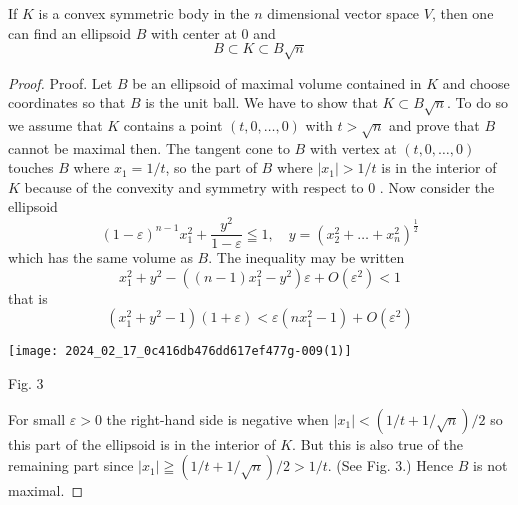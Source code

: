 \begin{lemma}
    If $K$ is a convex symmetric body in the $n$ dimensional vector space $V$, then one can find an ellipsoid $B$ with center at $0$ and
\[
	B \subset K \subset B \sqrt{n}
\]
\end{lemma}
\begin{proof}
    Proof. Let $B$ be an ellipsoid of maximal volume contained in $K$ and choose coordinates so that $B$ is the unit ball. We have to show that $K\subset B \sqrt{n}$. To do so we assume that $K$ contains a point $(t, 0, \ldots, 0)$ with $t>\sqrt{n}$ and prove that $B$ cannot be maximal then. The tangent cone to $B$ with vertex at $(t, 0, \ldots, 0)$ touches $B$ where $x_{1}=1 / t$, so the part of $B$ where $\left|x_{1}\right|>1 / t$ is in the interior of $K$ because of the convexity and symmetry with respect to 0 . Now consider the ellipsoid
\[
	(1-\varepsilon)^{n-1} x_{1}^{2}+ \frac{y^{2}}{1-\varepsilon}\leqq 1, \quad y=\left(x_{2}^{2}+\ldots+x_{n}^{2}\right)^{\frac{1}{2}}
\]
which has the same volume as $B$. The inequality may be written
\[
    x_{1}^{2}+y^{2}-\left((n-1) x_{1}^{2}-y^{2}\right) \varepsilon+O\left(\varepsilon^{2}\right)<1     
\]
that is
\[
    \left(x_{1}^{2}+y^{2}-1\right)(1+\varepsilon)<\varepsilon\left(n x_{1}^{2}-1\right)+O\left(\varepsilon^{2}\right)
\]
\begin{center}
	\texttt{[image: 2024\_02\_17\_0c416db476dd617ef477g-009(1)]}
    
    Fig. 3
\end{center}
For small $\varepsilon>0$ the right-hand side is negative when $\left|x_{1}\right|<(1 / t+1 / \sqrt{n}) / 2$ so this part of the ellipsoid is in the interior of $K$. But this is also true of the remaining part since $\left|x_{1}\right| \geqq(1 / t+1 / \sqrt{n}) / 2>1 / t$. (See Fig. 3.) Hence $B$ is not maximal.
\end{proof}


